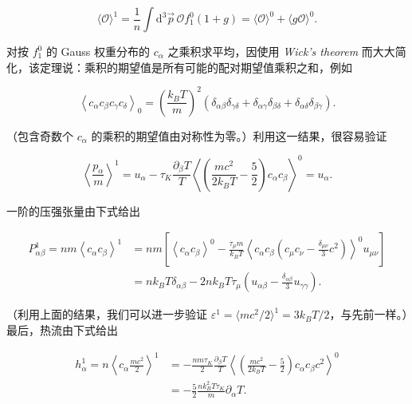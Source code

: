 \begin{equation}\label{eq:3.115}
  \langle\mathcal O\rangle^1=\frac{1}{n}\int \mathrm{d}^3\vec p\,\mathcal Of_1^0\left(1+g\right)=\langle\mathcal O\rangle^0+\langle g\mathcal O\rangle^0.
\end{equation}

对按 $f_1^0$ 的 Gauss 权重分布的 $c_\alpha$ 之乘积求平均，因使用 \textit{Wick's theorem} 而大大简化，该定理说：乘积的期望值是所有可能的配对期望值乘积之和，例如

\begin{equation}\label{eq:3.116}
  \left\langle c_\alpha c_\beta c_\gamma c_\delta\right\rangle_0=\left(\frac{k_BT}{m}\right)^2\left(\delta_{\alpha\beta}\delta_{\gamma\delta}+\delta_{\alpha\gamma}\delta_{\beta\delta}+\delta_{\alpha\delta}\delta_{\beta\gamma}\right).
\end{equation}

（包含奇数个 $c_\alpha$ 的乘积的期望值由对称性为零。）利用这一结果，很容易验证

\begin{equation}\label{eq:3.117}
  \left\langle\frac{p_\alpha}{m}\right\rangle^1=u_\alpha-\tau_K\frac{\partial_\beta T}{T}\left\langle\left(\frac{mc^2}{2k_BT}-\frac{5}{2}\right)c_\alpha c_\beta\right\rangle^0=u_\alpha.
\end{equation}

一阶的压强张量由下式给出

\begin{equation}\label{eq:3.118}
  \begin{aligned}
    P_{\alpha\beta}^1=nm\left\langle c_\alpha c_\beta\right\rangle^1&=nm\left[\left\langle c_\alpha c_\beta\right\rangle^0-\frac{\tau_\mu m}{k_BT}\left\langle c_\alpha c_\beta\left(c_\mu c_\nu-\frac{\delta_{\mu\nu}}{3}c^2\right)\right\rangle^0u_{\mu\nu}\right]\\
    &=nk_BT\delta_{\alpha\beta}-2nk_BT\tau_\mu\left(u_{\alpha\beta}-\frac{\delta_{\alpha\beta}}{3}u_{\gamma\gamma}\right).
  \end{aligned}
\end{equation}

（利用上面的结果，我们可以进一步验证 $\varepsilon^1=\langle mc^2/2\rangle^1=3k_BT/2$，与先前一样。）最后，热流由下式给出

\begin{equation}\label{eq:3.119}
  \begin{aligned}
    h_\alpha^1=n\left\langle c_\alpha\frac{mc^2}{2}\right\rangle^1&=-\frac{nm\tau_K}{2}\frac{\partial_\beta T}{T}\left\langle\left(\frac{mc^2}{2k_BT}-\frac{5}{2}\right)c_\alpha c_\beta c^2\right\rangle^0\\
    &=-\frac{5}{2}\frac{nk_B^2T\tau_K}{m}\partial_\alpha T.
  \end{aligned}
\end{equation}

